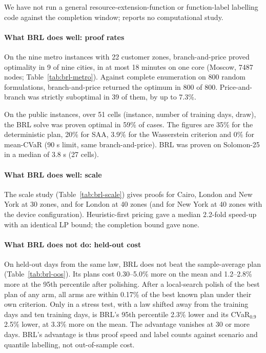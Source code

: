 \documentclass[preprint,11pt]{elsarticle}
\theoremstyle{definition}
\theoremstyle{remark}
\begin{document}
We have not run a general resource-extension-function or function-label labelling code \citep{Dabia2013} against the completion window; \citet{Irnich2008} reports no computational study.

\paragraph{What BRL does well: proof rates} On the nine metro instances with 22 customer zones, branch-and-price proved optimality in 9 of nine cities, in at most 18 minutes on one core (Moscow, 7487 nodes; Table~\ref{tab:brl-metro}). Against complete enumeration on 800 random formulations, branch-and-price returned the optimum in 800 of 800. Price-and-branch was strictly suboptimal in 39 of them, by up to 7.3\%.

On the public instances, over 51 cells (instance, number of training days, draw), the BRL solve was proven optimal in 59\% of cases. The figures are 35\% for the deterministic plan, 20\% for SAA, 3.9\% for the Wasserstein criterion and 0\% for mean-CVaR (90 s limit, same branch-and-price). BRL was proven on Solomon-25 in a median of 3.8 s (27 cells).

\paragraph{What BRL does well: scale} The scale study (Table~\ref{tab:brl-scale}) gives proofs for Cairo, London and New York at 30 zones, and for London at 40 zones (and for New York at 40 zones with the device configuration). Heuristic-first pricing gave a median 2.2-fold speed-up with an identical LP bound; the completion bound gave none.

\paragraph{What BRL does not do: held-out cost} On held-out days from the same law, BRL does not beat the sample-average plan (Table~\ref{tab:brl-oos}). Its plans cost 0.30--5.0\% more on the mean and 1.2--2.8\% more at the 95th percentile after polishing. After a local-search polish of the best plan of any arm, all arms are within 0.17\% of the best known plan under their own criterion. Only in a stress test, with a law shifted away from the training days and ten training days, is BRL's 95th percentile 2.3\% lower and its CVaR$_{0.9}$ 2.5\% lower, at 3.3\% more on the mean. The advantage vanishes at 30 or more days. BRL's advantage is thus proof speed and label counts against scenario and quantile labelling, not out-of-sample cost.
\end{document}
